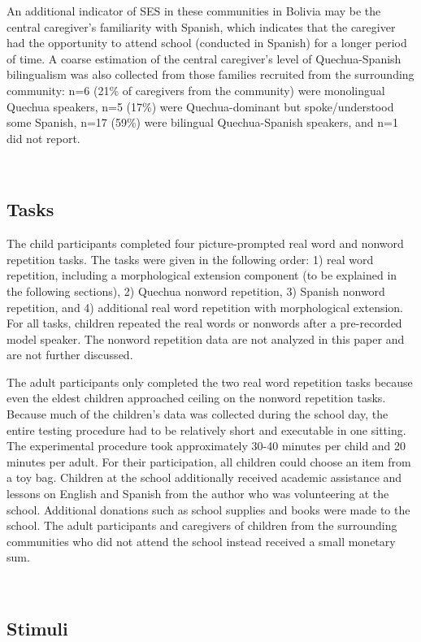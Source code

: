 \documentclass[a4paper,man,floatsintext,natbib,donotrepeattitle, apacite]{apa6}
\begin{document}
An additional indicator of SES in these communities in Bolivia may be the central caregiver's familiarity with Spanish, which indicates that the caregiver had the opportunity to attend school (conducted in Spanish) for a longer period of time. A coarse estimation of the central caregiver's level of Quechua-Spanish bilingualism was also collected from those families recruited from the surrounding community: n=6 (21\% of caregivers from the community) were monolingual Quechua speakers, n=5 (17\%) were Quechua-dominant but spoke/understood some Spanish, n=17 (59\%) were bilingual Quechua-Spanish speakers, and n=1 did not report. 

~
~

 \subsection{Tasks}

The child participants completed four picture-prompted real word and nonword repetition tasks. The tasks were given in the following order: 1) real word repetition, including a morphological extension component (to be explained in the following sections), 2) Quechua nonword repetition, 3) Spanish nonword repetition, and 4) additional real word repetition with morphological extension. For all tasks, children repeated the real words or nonwords after a pre-recorded model speaker. The nonword repetition data are not analyzed in this paper and are not further discussed. 

The adult participants only completed the two real word repetition tasks because even the eldest children approached ceiling on the nonword repetition tasks. Because much of the children's data was collected during the school day, the entire testing procedure had to be relatively short and executable in one sitting. The experimental procedure took approximately 30-40 minutes per child and 20 minutes per adult. For their participation, all children could choose an item from a toy bag. Children at the school additionally received academic assistance and lessons on English and Spanish from the author who was volunteering at the school. Additional donations such as school supplies and books were made to the school. The adult participants and caregivers of children from the surrounding communities who did not attend the school instead received a small monetary sum.


~
~

\subsection{Stimuli}\label{ch3-stimuli}
\end{document}
